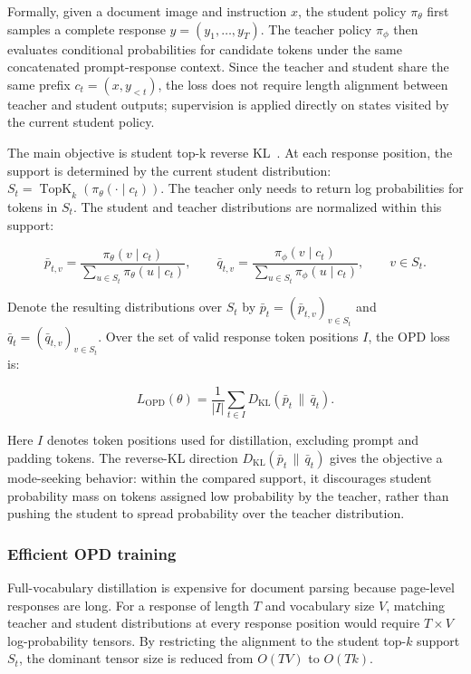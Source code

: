 Formally, given a document image and instruction \(x\), the student policy \(\pi_\theta\) first samples a complete response \(y=(y_1,\ldots,y_T)\). The teacher policy \(\pi_\phi\) then evaluates conditional probabilities for candidate tokens under the same concatenated prompt-response context. Since the teacher and student share the same prefix \(c_t=(x,y_{<t})\), the loss does not require length alignment between teacher and student outputs; supervision is applied directly on states visited by the current student policy.

The main objective is student top-k reverse KL~\cite{li2026rethinkingopd}. At each response position, the support is determined by the current student distribution: \(S_t = \operatorname{TopK}_k\!\left(\pi_\theta(\cdot \mid c_t)\right)\). The teacher only needs to return log probabilities for tokens in \(S_t\). The student and teacher distributions are normalized within this support:

\[
\bar{p}_{t,v}
= \frac{\pi_\theta(v \mid c_t)}{\sum_{u \in S_t}\pi_\theta(u \mid c_t)},
\qquad
\bar{q}_{t,v}
= \frac{\pi_\phi(v \mid c_t)}{\sum_{u \in S_t}\pi_\phi(u \mid c_t)},
\qquad v\in S_t.
\]

Denote the resulting distributions over \(S_t\) by \(\bar{p}_t=(\bar{p}_{t,v})_{v\in S_t}\) and \(\bar{q}_t=(\bar{q}_{t,v})_{v\in S_t}\). Over the set of valid response token positions \(I\), the OPD loss is:

\[
L_{\mathrm{OPD}}(\theta)
=
\frac{1}{|I|}
\sum_{t \in I}
D_{\mathrm{KL}}\!\left(
\bar{p}_t \,\|\, \bar{q}_t
\right).
\]

Here \(I\) denotes token positions used for distillation, excluding prompt and padding tokens. The reverse-KL direction \(D_{\mathrm{KL}}(\bar{p}_t \,\|\, \bar{q}_t)\) gives the objective a mode-seeking behavior: within the compared support, it discourages student probability mass on tokens assigned low probability by the teacher, rather than pushing the student to spread probability over the teacher distribution.

\subsubsection{Efficient OPD training}

Full-vocabulary distillation is expensive for document parsing because page-level responses are long. For a response of length \(T\) and vocabulary size \(V\), matching teacher and student distributions at every response position would require \(T \times V\) log-probability tensors. By restricting the alignment to the student top-\(k\) support \(S_t\), the dominant tensor size is reduced from \(O(TV)\) to \(O(Tk)\).


